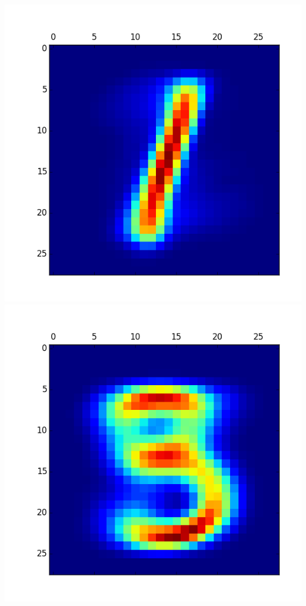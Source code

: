 \documentclass[11pt]{article}
\begin{document}
\begin{itemize}
\includegraphics[scale = 0.5]{22.png}
\includegraphics[scale = 0.5]{23.png}


\end{itemize}
\end{document}
